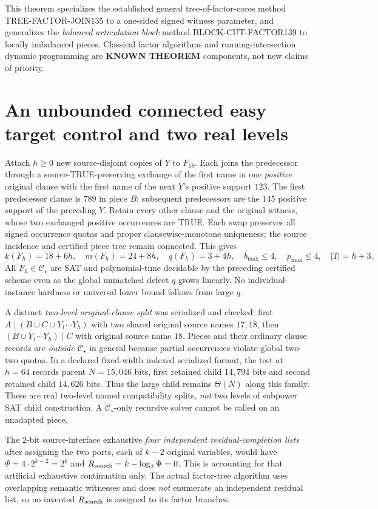 \documentclass[11pt]{article}
\newcommand{\CS}{\mathcal C_{\star}}
\begin{document}
This theorem specializes the established general tree-of-factor-cores method TREE-FACTOR-JOIN135 to a one-sided signed witness parameter, and generalizes the \emph{balanced articulation block} method BLOCK-CUT-FACTOR139 to locally imbalanced pieces. Classical factor algorithms and running-intersection dynamic programming are \textbf{KNOWN THEOREM} components, not new claims of priority.

\section{An unbounded connected easy target control and two real levels}
Attach \(h\ge0\) new source-disjoint copies of \(Y\) to \(F_{18}\). Each joins the predecessor through a source-TRUE-preserving exchange of the first name in one \emph{positive} original clause with the first name of the next \(Y\)'s positive support \(123\). The first predecessor clause is \(789\) in piece \(B\); subsequent predecessors are the \(145\) positive support of the preceding \(Y\). Retain every other clause and the original witness, whose two exchanged positive occurrences are TRUE. Each swap preserves all signed occurrence quotas and proper clausewise-monotone uniqueness; the source incidence and certified piece tree remain connected. This gives
\[
 k(F_h)=18+6h,\quad m(F_h)=24+8h,\quad
 q(F_h)=3+4h,\quad
 b_{\max}\le4,\quad p_{\max}\le4,\quad |T|=h+3.
\]
All \(F_h\in\CS\) are SAT and polynomial-time decidable by the preceding certified scheme even as the global unmatched defect \(q\) grows linearly. No individual-instance hardness or universal lower bound follows from large \(q\).

A distinct \emph{two-level original-clause split} was serialized and checked: first \(A\mid(B\cup C\cup Y_1\cdots Y_h)\) with two shared original source names \(17,18\), then \((B\cup Y_1\cdots Y_h)\mid C\) with original source name \(18\). Pieces and their ordinary clause records are \emph{outside \(\CS\)} in general because partial occurrences violate global two-two quotas. In a declared fixed-width indexed serialized format, the test at \(h=64\) records parent \(N=15{,}046\) bits, first retained child \(14{,}794\) bits and second retained child \(14{,}626\) bits. Thus the large child remains \(\Theta(N)\) along this family. These are real two-level named compatibility splits, \emph{not} two levels of subpower SAT child construction. A \(\CS\)-only recursive solver cannot be called on an unadapted piece.

The 2-bit source-interface exhaustive \emph{four independent residual-completion lists} after assigning the two ports, each of \(k-2\) original variables, would have \(\Psi=4\cdot2^{k-2}=2^k\) and \(R_{\rm search}=k-\log_2\Psi=0\). This is accounting for that artificial exhaustive continuation only. The actual factor-tree algorithm uses overlapping semantic witnesses and does \emph{not} enumerate an independent residual list, so no invented \(R_{\rm search}\) is assigned to its factor branches.
\end{document}
